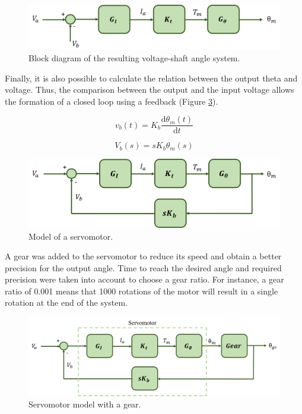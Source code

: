 \begin{figure}[H]
\centering
\includegraphics[scale=0.6]{figures/model3.png}
\caption{Block diagram of the resulting voltage-shaft angle system.}
\label{model3}
\end{figure}

Finally, it is also possible to calculate the relation between the output theta and voltage. Thus, the comparison between the output and the input voltage allows the formation of a closed loop using a feedback (Figure \ref{model4}).

\begin{equation}\label{feedback1}
v_{b}(t)= K_{b}\frac{\mathrm{d} \theta_{m}(t)}{\mathrm{d} t}
\end{equation}

\begin{equation}\label{feedback2}
V_{b}(s)= sK_{b}\theta_{m}(s)
\end{equation}

\begin{figure}[H]
\centering
\includegraphics[scale=0.6]{figures/model4.png}
\caption{Model of a servomotor.}
\label{model4}
\end{figure}

A gear was added to the servomotor to reduce its speed and obtain a better precision for the output angle. Time to reach the desired angle and required precision were taken into account to choose a gear ratio.
For instance, a gear ratio of 0.001 means that 1000 rotations of the motor will result in a single rotation at the end of the system.

\begin{figure}[H]
\centerline{
\includegraphics[scale=0.5]{figures/servo+gear.png}}
\caption{Servomotor model with a gear.}
\label{model4}
\end{figure}

